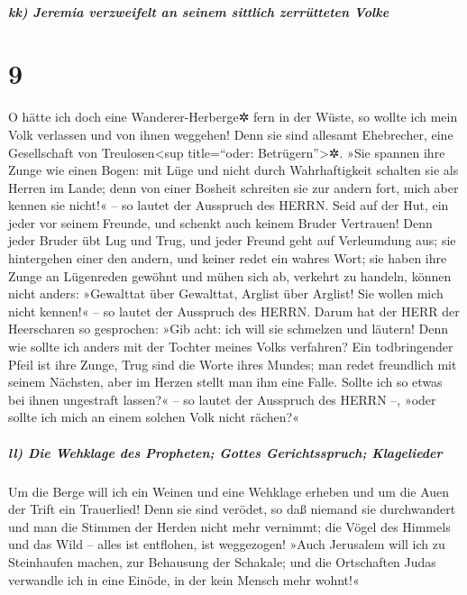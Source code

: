 \hypertarget{kk-jeremia-verzweifelt-an-seinem-sittlich-zerruxfctteten-volke}{%
\subparagraph{kk) Jeremia verzweifelt an seinem sittlich zerrütteten
Volke}\label{kk-jeremia-verzweifelt-an-seinem-sittlich-zerruxfctteten-volke}}

\hypertarget{section-8}{%
\section{9}\label{section-8}}

O hätte ich doch eine Wanderer-Herberge✲ fern in der
Wüste, so wollte ich mein Volk verlassen und von ihnen weggehen! Denn
sie sind allesamt Ehebrecher, eine Gesellschaft von
Treulosen\textless sup title=``oder: Betrügern''\textgreater✲.
»Sie spannen ihre Zunge wie einen Bogen: mit Lüge und
nicht durch Wahrhaftigkeit schalten sie als Herren im Lande; denn von
einer Bosheit schreiten sie zur andern fort, mich aber kennen sie
nicht!« -- so lautet der Ausspruch des HERRN. Seid auf der
Hut, ein jeder vor seinem Freunde, und schenkt auch keinem Bruder
Vertrauen! Denn jeder Bruder übt Lug und Trug, und jeder Freund geht auf
Verleumdung aus; sie hintergehen einer den andern, und
keiner redet ein wahres Wort; sie haben ihre Zunge an Lügenreden gewöhnt
und mühen sich ab, verkehrt zu handeln, können nicht anders:
»Gewalttat über Gewalttat, Arglist über Arglist! Sie
wollen mich nicht kennen!« -- so lautet der Ausspruch des HERRN.
Darum hat der HERR der Heerscharen so gesprochen: »Gib
acht: ich will sie schmelzen und läutern! Denn wie sollte ich anders mit
der Tochter meines Volks verfahren? Ein todbringender
Pfeil ist ihre Zunge, Trug sind die Worte ihres Mundes; man redet
freundlich mit seinem Nächsten, aber im Herzen stellt man ihm eine
Falle. Sollte ich so etwas bei ihnen ungestraft lassen?«
-- so lautet der Ausspruch des HERRN --, »oder sollte ich mich an einem
solchen Volk nicht rächen?«

\hypertarget{ll-die-wehklage-des-propheten-gottes-gerichtsspruch-klagelieder}{%
\subparagraph{ll) Die Wehklage des Propheten; Gottes Gerichtsspruch;
Klagelieder}\label{ll-die-wehklage-des-propheten-gottes-gerichtsspruch-klagelieder}}

Um die Berge will ich ein Weinen und eine Wehklage erheben
und um die Auen der Trift ein Trauerlied! Denn sie sind verödet, so daß
niemand sie durchwandert und man die Stimmen der Herden nicht mehr
vernimmt; die Vögel des Himmels und das Wild -- alles ist entflohen, ist
weggezogen! »Auch Jerusalem will ich zu Steinhaufen
machen, zur Behausung der Schakale; und die Ortschaften Judas verwandle
ich in eine Einöde, in der kein Mensch mehr wohnt!«

